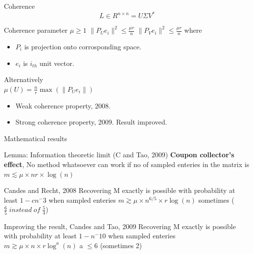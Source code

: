 \documentclass{beamer}
\begin{document}
\begin{frame}{Coherence}
	$$ L \in R^{n \times n} = U \Sigma V^* $$
	\begin{block}{Coherence parameter $\mu \ge 1$}
		\vspace{3mm}
		\hspace{4mm} $\parallel P_U e_i \parallel^2 \le \frac{\mu r} {n}$ \hspace{5mm}	$\parallel P_V e_i \parallel^2 \le \frac{\mu r} {n}$ 
		where \\
		\begin {itemize}
			\item $P_i$ is projection onto corrosponding space. \\
			\item $e_i$ is $i_{th}$ unit vector. \\
		\end {itemize}
			
		 Alternatively \\
			\center $\mu(U) = \frac{n}{r} \max( \parallel P_U e_i \parallel) $
	\end{block}
	
	\begin{itemize}
		\item Weak coherence property, 2008.
		\item Strong coherence property, 2009. Result improved.
	\end{itemize}

\end{frame}
	
\begin{frame}{Mathematical results}
	\begin{block}{Lemma: Information theoretic limit (C and Tao, 2009)}
		\textbf{Coupon collector's effect}, No method whatsoever can work if no of sampled enteries in the matrix is
		\center $m \lesssim \mu \times nr \times \log(n)$
	\end{block}
	
	\begin{block}{Candes and Recht, 2008}
		Recovering M exactly is possible with probability at least $1-cn^-3$ when sampled enteries
		\center $m \gtrsim \mu \times n^{6/5} \times r \log(n) $ \hspace{5mm} sometimes ($\frac{6}{5} \; instead \; of \; \frac{5}{4}$)
	\end{block}
	
	\begin{block}{Improving the result, Candes and Tao, 2009}
		Recovering M exactly is possible with probability at least $1-n^-10$ when sampled enteries
		\center $m \gtrsim \mu \times n \times r \log^a(n) $ \hspace{5mm} a $\le 6$ (sometimes 2)
	\end{block}
\end{frame}
\end{document}
